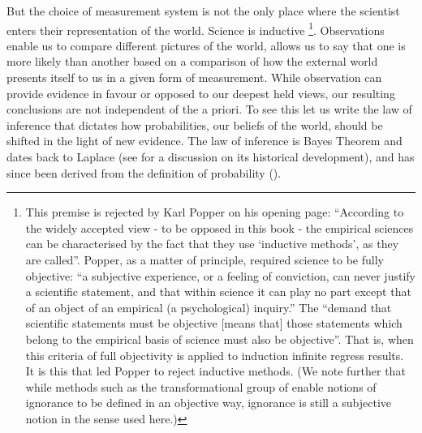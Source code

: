 But the choice of measurement system is not the only place where the scientist enters 
their representation of the world.
Science is inductive%
\footnote{
This premise is  rejected by Karl Popper\cite{Popper2002} on his opening
page:
``According to the widely accepted view - to be opposed in this book - 
the empirical sciences can be characterised by the fact that they use
`inductive methods', as they are called''.
Popper, as a matter of principle, required science to be fully
objective:
``a subjective experience, or a feeling of conviction, can never
justify a scientific statement, and that within science it can play no
part except that of an object of an empirical (a psychological)
inquiry.''
The ``demand that scientific statements must be objective [means that]
those statements which belong to the empirical basis of science must
also be objective''. 
That is, when this criteria of full objectivity is applied to  induction
infinite regress results.  
It is this that led Popper to reject inductive methods.
(We note further that while methods such as the transformational group of
\cite{Jaynes1973a} enable notions of ignorance to be defined in an
objective way, ignorance is still a subjective notion in the sense
used here.)
%
%
%
}.
Observations enable us to compare different pictures of the world,
allows us to say that one is more likely than another
based on a comparison of how the external world presents itself to us in a given form of measurement.
While observation can provide evidence in favour or opposed to our
deepest held views,
our resulting conclusions are  not independent of the a priori.
To see this let us write the law of inference
that dictates how probabilities,
our beliefs of the world,
should be shifted in the light of new evidence.
The law of inference is Bayes Theorem and dates back to 
Laplace (see \cite{Jaynes1979} for a discussion on its historical development),
and has since been derived from the definition of probability
(\cite{Cox1946, Skilling1991}).

